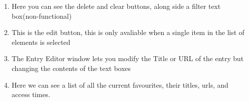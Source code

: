 \documentclass[../Main.tex]{subfiles}
\begin{document}
\begin{enumerate}
    \item Here you can see the delete and clear buttons, along side a filter text box(non-functional)
    \item This is the edit button, this is only avaliable when a single item in the list of elements is selected
    \item The Entry Editor window lets you modify the Title or URL of the entry but changing the contents of the text boxes
    \item Here we can see a list of all the current favourites, their titles, urls, and access times.
\end{enumerate}
\end{document}
